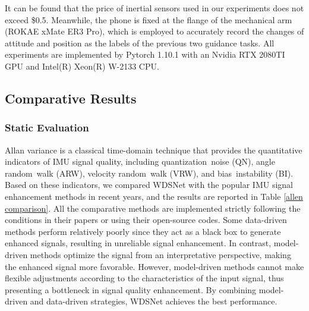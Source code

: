 \documentclass[letterpaper]{article} %
\begin{document}
	It can be found that the price of inertial sensors used in our experiments does not exceed \$0.5.
	Meanwhile, the phone is fixed at the flange of the mechanical arm (ROKAE xMate ER3 Pro), which is employed to accurately record the changes of attitude and position as the labels of the previous two guidance tasks.
	All experiments are implemented by Pytorch 1.10.1 with an Nvidia RTX 2080TI GPU and Intel(R) Xeon(R) W-2133 CPU.
	
	\subsection{Comparative Results}
	\subsubsection{Static Evaluation}
	Allan variance is a classical time-domain technique that provides the quantitative indicators of IMU signal quality, including quantization noise (QN), angle random walk (ARW), velocity random walk (VRW), and bias instability (BI).
	Based on these indicators, we compared WDSNet with the popular IMU signal enhancement methods in recent years, and the results are reported in Table \ref{allen comparison}.
	All the comparative methods are implemented strictly following the conditions in their papers or using their open-source codes.
	Some data-driven methods perform relatively poorly since they act as a black box to generate enhanced signals, resulting in unreliable signal enhancement. In contrast, model-driven methods optimize the signal from an interpretative perspective, making the enhanced signal more favorable. However, model-driven methods cannot make flexible adjustments according to the characteristics of the input signal, thus presenting a bottleneck in signal quality enhancement.
	By combining model-driven and data-driven strategies, WDSNet achieves the best performance.
	
	
	
\end{document}
